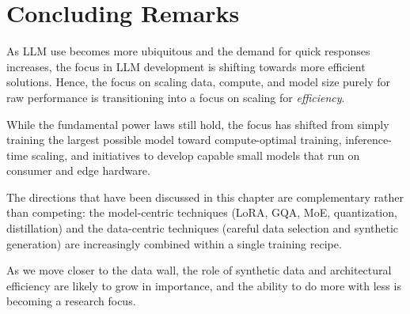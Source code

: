 \section{Concluding Remarks}
As LLM use becomes more ubiquitous and the demand for quick responses increases, the focus in LLM development is shifting towards more efficient solutions. Hence, the focus on scaling data, compute, and model size purely for raw performance is transitioning into a focus on scaling for \emph{efficiency}. 

While the fundamental power laws still   hold, the focus has shifted from simply training the largest possible model toward compute-optimal training, inference-time scaling, and  initiatives to develop capable small models that run on consumer and edge hardware. 

The directions that have been discussed in this chapter are complementary rather than competing: the model-centric techniques (LoRA, GQA, MoE, quantization, distillation) and the data-centric techniques (careful data selection and synthetic generation) are increasingly combined within a single training recipe. 

As we move closer to the data wall, the role of synthetic data and architectural efficiency are likely to grow in importance, and the ability to do more with less is becoming a  research focus.




